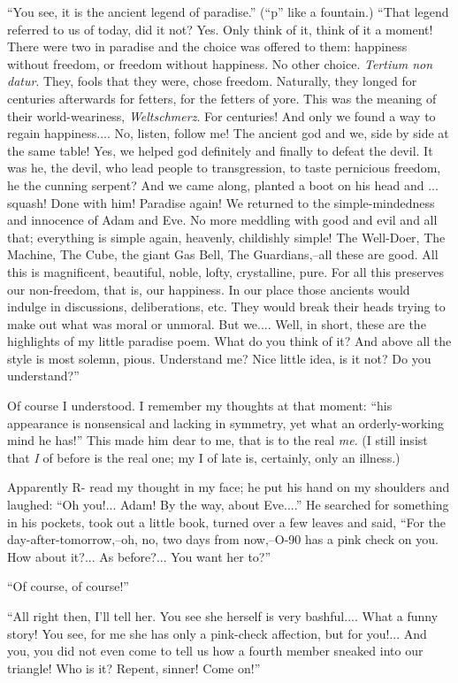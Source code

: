 \documentclass[11pt,openany]{book}
\begin{document}
``You see, it is the ancient legend of paradise.'' (``p'' like a fountain.) ``That legend referred to us of today, did it not? Yes. Only think of it, think of it a moment! There were two in paradise and the choice was offered to them: happiness without freedom, or freedom without happiness. No other choice. \emph{Tertium non datur}. They, fools that they were, chose freedom. Naturally, they longed for centuries afterwards for fetters, for the fetters of yore. This was the meaning of their world-weariness, \emph{Weltschmerz}. For centuries! And only we found a way to regain happiness.... No, listen, follow me! The ancient god and we, side by side at the same table! Yes, we helped god definitely and finally to defeat the devil. It was he, the devil, who lead people to transgression, to taste pernicious freedom, he the cunning serpent? And we came along, planted a boot on his head and ... squash! Done with him! Paradise again! We returned to the simple-mindedness and innocence of Adam and Eve. No more meddling with good and evil and all that; everything is simple again, heavenly, childishly simple! The Well-Doer, The Machine, The Cube, the giant Gas Bell, The Guardians,--all these are good. All this is magnificent, beautiful, noble, lofty, crystalline, pure. For all this preserves our non-freedom, that is, our happiness. In our place those ancients would indulge in discussions, deliberations, etc. They would break their heads trying to make out what was moral or unmoral. But we.... Well, in short, these are the highlights of my little paradise poem. What do you think of it? And above all the style is most solemn, pious. Understand me? Nice little idea, is it not? Do you understand?''

Of course I understood. I remember my thoughts at that moment: ``his appearance is nonsensical and lacking in symmetry, yet what an orderly-working mind he has!'' This made him dear to me, that is to the real \emph{me}. (I still insist that \emph{I} of before is the real one; my I of late is, certainly, only an illness.)

Apparently R- read my thought in my face; he put his hand on my shoulders and laughed: ``Oh you!... Adam! By the way, about Eve....'' He searched for something in his pockets, took out a little book, turned over a few leaves and said, ``For the day-after-tomorrow,--oh, no, two days from now,--O-90 has a pink check on you. How about it?... As before?... You want her to?''

``Of course, of course!''

``All right then, I'll tell her. You see she herself is very bashful.... What a funny story! You see, for me she has only a pink-check affection, but for you!... And you, you did not even come to tell us how a fourth member sneaked into our triangle! Who is it? Repent, sinner! Come on!''
\end{document}
